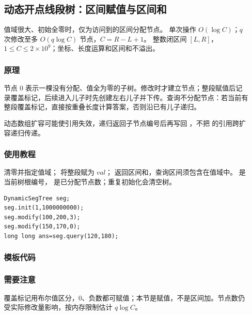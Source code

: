 \subsection{动态开点线段树：区间赋值与区间和}
\label{ds:seg-dynamic}
\AlgorithmInfo
    {值域很大、初始全零时，仅为访问到的区间分配节点。}
    {单次操作 $O(\log C)$；$q$ 次修改至多 $O(q\log C)$ 节点，$C=R-L+1$。}
    {整数闭区间 $[L,R]$，$1\le C\le2\times10^9$；坐标、长度运算和区间和不溢出。}
\subsubsection*{原理}
节点 0 表示一棵没有分配、值全为零的子树。修改时才建立节点；整段赋值后记录覆盖标记，后续进入儿子时先创建左右儿子并下传。查询不分配节点：若当前有整段覆盖标记，直接按重叠长度计算答案，否则沿已有儿子递归。

动态数组扩容可能使引用失效，递归返回子节点编号后再写回 ，不把  的引用跨扩容递归传递。

\subsubsection*{使用教程}
 清零并指定值域； 将整段赋为 $val$； 返回区间和，查询区间须包含在值域中。 是当前树根编号， 是已分配节点数；重复初始化会清空树。
\begin{lstlisting}[style=mtycpp,numbers=none]
DynamicSegTree seg;
seg.init(1,1000000000);
seg.modify(100,200,3);
seg.modify(150,170,0);
long long ans=seg.query(120,180);
\end{lstlisting}
\subsubsection*{模板代码}
\subsubsection*{需要注意}
覆盖标记用布尔值区分，0、负数都可赋值；本节是赋值，不是区间加。节点数仍受实际修改量影响，按内存限制估计 $q\log C$。
